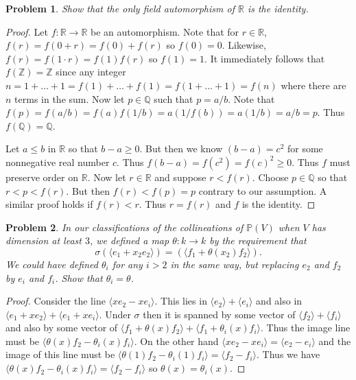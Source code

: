 \documentclass{article}
\newtheorem{problem}{Problem}
\begin{document}
\begin{problem}
Show that the only field automorphism of $\mathbb{R}$ is the identity.
\end{problem}
\begin{proof}
Let $f : \mathbb{R} \to \mathbb{R}$ be an automorphism. Note that for $r \in \mathbb{R}$, $f(r) = f(0 + r) = f(0) + f(r)$ so $f(0) = 0$. Likewise, $f(r) = f(1 \cdot r) = f(1) f(r)$ so $f(1) = 1$. It immediately follows that $f(\mathbb{Z}) = \mathbb{Z}$ since any integer $n = 1 + \dots + 1 = f(1) + \dots + f(1) = f(1 + \dots + 1) = f(n)$ where there are $n$ terms in the sum. Now let $p \in \mathbb{Q}$ such that $p = a/b$. Note that $f(p) = f(a/b) = f(a)f(1/b) = a(1/f(b)) = a(1/b) = a/b = p$. Thus $f(\mathbb{Q}) = \mathbb{Q}$. 

Let $a \leq b$ in $\mathbb{R}$ so that $b-a \geq 0$. But then we know $(b-a) = c^2$ for some nonnegative real number $c$. Thus $f(b-a) = f(c^2) = f(c)^2 \geq 0$. Thus $f$ must preserve order on $\mathbb{R}$. Now let $r \in \mathbb{R}$ and suppose $r < f(r)$. Choose $p \in \mathbb{Q}$ so that $r < p < f(r)$. But then $f(r) < f(p) = p$ contrary to our assumption. A similar proof holds if $f(r) < r$. Thus $r = f(r)$ and $f$ is the identity.
\end{proof}

\begin{problem}
In our classifications of the collineations of $\mathbb{P}(V)$ when $V$ has dimension at least $3$, we defined a map $\theta : k \to k$ by the requirement that
\[
\sigma(\langle e_1 + x_2e_2 \rangle ) = (\langle f_1 + \theta(x_2)f_2 \rangle ).
\]
We could have defined $\theta_i$ for any $i > 2$ in the same way, but replacing $e_2$ and $f_2$ by $e_i$ and $f_i$. Show that $\theta_i = \theta$.
\end{problem}
\begin{proof}
Consider the line $\langle xe_2 - xe_i \rangle$. This lies in $\langle e_2 \rangle + \langle e_i \rangle$ and also in $\langle e_1 + xe_2 \rangle + \langle e_1 + xe_i \rangle$. Under $\sigma$ then it is spanned by some vector of $\langle f_2 \rangle + \langle f_i \rangle$ and also by some vector of $\langle f_1 + \theta(x) f_2 \rangle + \langle f_1 + \theta_i(x) f_i \rangle$. Thus the image line must be $\langle \theta(x) f_2 - \theta_i(x) f_i \rangle$. On the other hand $\langle xe_2 - xe_i \rangle = \langle e_2 - e_i \rangle$ and the image of this line must be $\langle \theta(1) f_2 - \theta_i(1) f_i \rangle = \langle f_2 - f_i \rangle$. Thus we have $\langle \theta(x) f_2 - \theta_i(x) f_i \rangle = \langle f_2 - f_i \rangle$ so $\theta(x) = \theta_i(x)$.
\end{proof}
\end{document}
